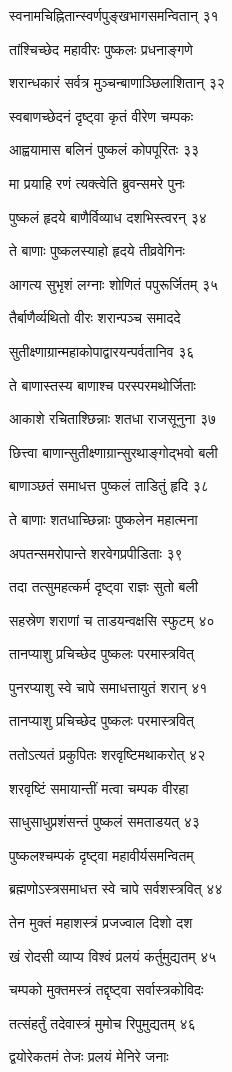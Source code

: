 स्वनामचिह्नितान्स्वर्णपुङ्खभागसमन्वितान् ३१

तांश्चिच्छेद महावीरः पुष्कलः प्रधनाङ्गणे

शरान्धकारं सर्वत्र मुञ्चन्बाणाञ्छिलाशितान् ३२

स्वबाणच्छेदनं दृष्ट्वा कृतं वीरेण चम्पकः

आह्वयामास बलिनं पुष्कलं कोपपूरितः ३३

मा प्रयाहि रणं त्यक्त्वेति ब्रुवन्समरे पुनः

पुष्कलं हृदये बाणैर्विव्याध दशभिस्त्वरन् ३४

ते बाणाः पुष्कलस्याहो हृदये तीव्रवेगिनः

आगत्य सुभृशं लग्नाः शोणितं पपुरूर्जितम् ३५

तैर्बाणैर्व्यथितो वीरः शरान्पञ्च समाददे

सुतीक्ष्णाग्रान्महाकोपाद्वारयन्पर्वतानिव ३६

ते बाणास्तस्य बाणाश्च परस्परमथोर्जिताः

आकाशे रचिताश्छिन्नाः शतधा राजसूनुना ३७

छित्त्वा बाणान्सुतीक्ष्णाग्रान्सुरथाङ्गोद्भवो बली

बाणाञ्छतं समाधत्त पुष्कलं ताडितुं हृदि ३८

ते बाणाः शतधाच्छिन्नाः पुष्कलेन महात्मना

अपतन्समरोपान्ते शरवेगप्रपीडिताः ३९

तदा तत्सुमहत्कर्म दृष्ट्वा राज्ञः सुतो बली

सहस्रेण शराणां च ताडयन्वक्षसि स्फुटम् ४०

तानप्याशु प्रचिच्छेद पुष्कलः परमास्त्रवित्

पुनरप्याशु स्वे चापे समाधत्तायुतं शरान् ४१

तानप्याशु प्रचिच्छेद पुष्कलः परमास्त्रवित्

ततोऽत्यतं प्रकुपितः शरवृष्टिमथाकरोत् ४२

शरवृष्टिं समायान्तीं मत्वा चम्पक वीरहा

साधुसाधुप्रशंसन्तं पुष्कलं समताडयत् ४३

पुष्कलश्चम्पकं दृष्ट्वा महावीर्यसमन्वितम्

ब्रह्मणोऽस्त्रसमाधत्त स्वे चापे सर्वशस्त्रवित् ४४

तेन मुक्तं महाशस्त्रं प्रजज्वाल दिशो दश

खं रोदसी व्याप्य विश्वं प्रलयं कर्तुमुद्यतम् ४५

चम्पको मुक्तमस्त्रं तद्दृष्ट्वा सर्वास्त्रकोविदः

तत्संहर्तुं तदेवास्त्रं मुमोच रिपुमुद्यतम् ४६

द्वयोरेकतमं तेजः प्रलयं मेनिरे जनाः

